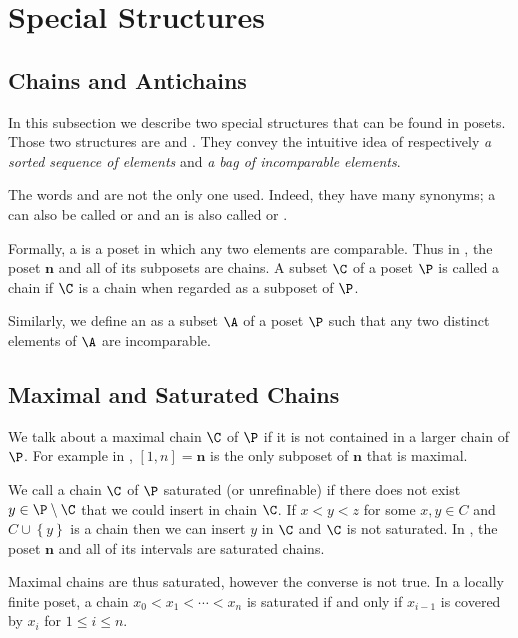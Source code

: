 \section{Special Structures}

\subsection*{Chains and Antichains}

In this subsection we describe two special structures that can be found in
posets. Those two structures are  and .
They convey the intuitive idea of respectively \emph{a sorted sequence of
elements} and \emph{a bag of incomparable elements}.

The words  and  are not the only one used.
Indeed, they have many synonyms; a  can also be called
 or  and an
 is also called  or
.


Formally, a  is a poset in which any two elements are
comparable. Thus in , the poset $\bm{n}$ and all of its
subposets are chains. A subset $\C$ of a poset $\P$ is called a chain if $\C$ is a
chain when regarded as a subposet of $\P$.

Similarly, we define an  as a subset $\A$ of a poset $\P$ such
that any two distinct elements of $\A$ are incomparable.

\subsection*{Maximal and Saturated Chains}

We talk about a maximal chain $\C$ of $\P$ if it is not contained in a larger
chain of $\P$. For example in , $[1, n] = \bm{n}$ is the
only subposet of $\bm{n}$ that is maximal.

We call a chain $\C$ of $\P$ saturated (or unrefinable) if there does not exist
$y \in \P \setminus \C$ that we could insert in chain $\C$. If $x < y < z$ for
some $x, y \in C$ and $C \cup \left\{{y}\right\}$ is a chain then we can insert
$y$ in $\C$ and $\C$ is not saturated. In , the poset
$\bm{n}$ and all of its intervals are saturated chains.

Maximal chains are thus saturated, however the converse is not true. In a
locally finite poset, a chain $x_0 < x_1 < \cdots < x_n$ is saturated if and
only if $x_{i-1}$ is covered by $x_i$ for $1 \le i \le n$.


